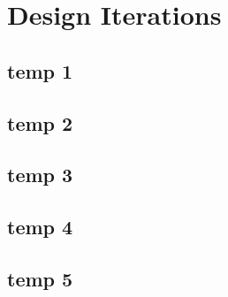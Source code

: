 \section{Design Iterations}

\subsection{temp 1}
\subsection{temp 2}
\subsection{temp 3}
\subsection{temp 4}
\subsection{temp 5}